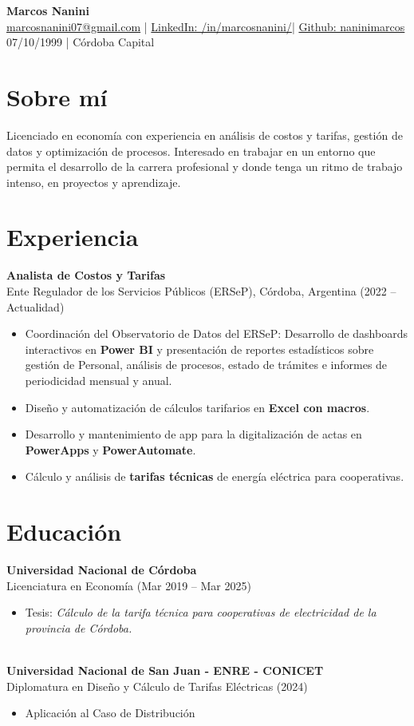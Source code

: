 \documentclass[a4paper,10pt]{article}
\begin{document}
\begin{center}
    {\LARGE \textbf{Marcos Nanini}} \\[5pt]
    \href{mailto:marcosnanini07@gmail.com}{marcosnanini07@gmail.com} \quad | \quad
    \href{https://www.linkedin.com/in/marcosnanini/}{LinkedIn: /in/marcosnanini/}\quad | \quad
    \href{https://github.com/naninimarcos/Proyectos_2024-2025}{Github: naninimarcos}
\\[5pt]
    07/10/1999 \quad | \quad Córdoba Capital
\end{center}

\section*{Sobre mí}
Licenciado en econom\'ia con experiencia en an\'alisis de costos y tarifas, gesti\'on de datos y optimizaci\'on de procesos. Interesado en trabajar en un entorno que permita el desarrollo de la carrera profesional y donde tenga un ritmo de trabajo intenso, en proyectos y aprendizaje.
\section*{Experiencia}
\textbf{Analista de Costos y Tarifas} \\
Ente Regulador de los Servicios P\'ublicos (ERSeP), C\'ordoba, Argentina (2022 – Actualidad)
\begin{itemize}
    \item Coordinaci\'on del Observatorio de Datos del ERSeP: Desarrollo de dashboards interactivos en \textbf{Power BI} y presentaci\'on de reportes estad\'isticos sobre gesti\'on de Personal, an\'alisis de procesos, estado de tr\'amites e informes de periodicidad mensual y anual.
    \item Dise\~no y automatizaci\'on de c\'alculos tarifarios en \textbf{Excel con macros}.
    \item Desarrollo y mantenimiento de app para la digitalizaci\'on de actas en\textbf{ PowerApps} y \textbf{PowerAutomate}.
    \item C\'alculo y análisis de \textbf{tarifas t\'ecnicas} de energ\'ia el\'ectrica para cooperativas.
\end{itemize}

\section*{Educaci\'on}
\textbf{Universidad Nacional de C\'ordoba} \\
Licenciatura en Econom\'ia (Mar 2019 – Mar 2025)
\begin{itemize}
    \item Tesis: \textit{C\'alculo de la tarifa t\'ecnica para cooperativas de electricidad de la provincia de C\'ordoba.}
\end{itemize}
\\
\textbf{Universidad Nacional de San Juan - ENRE - CONICET} \\
 Diplomatura en Diseño y Cálculo de Tarifas Eléctricas (2024)
 \begin{itemize}
 \item Aplicación al Caso de Distribución 
\end{itemize}
\end{document}
